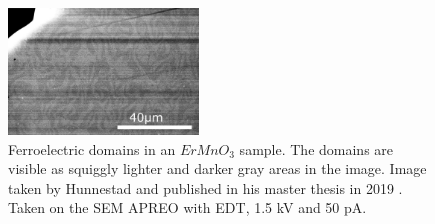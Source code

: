 \begin{figure}[ht]
    \centering
    \includegraphics[width=0.45\textwidth]{figures/ferroelectric_domains_SEM_Hunnestad2019.jpg}
    \caption{
        Ferroelectric domains in an $ErMnO_3$ sample.
        The domains are visible as squiggly lighter and darker gray areas in the image.
        Image taken by Hunnestad and published in his master thesis in 2019 \cite{hunnestad_visualizing_2019}.
        Taken on the SEM APREO with EDT, 1.5 kV and 50 pA.
    }
    \label{fig:ferroelectric_domains_SEM_Hunnestad2019}
\end{figure}
